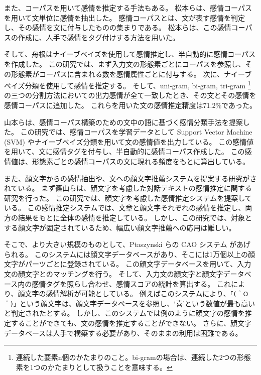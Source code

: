 \documentclass[11pt,a4j]{jsarticle}
\begin{document}
また、コーパスを用いて感情を推定する手法もある。
松本らは、感情コーパスを用いて文単位に感情を抽出した。
感情コーパスとは、文が表す感情を判定し、その感情を文に付与したものの集まりである。
松本らは、この感情コーパスの作成に、人手で感情をタグ付けする方法を用いた。

そして、舟根はナイーブベイズを使用して感情推定し、半自動的に感情コーパスを作成した。
この研究では、まず入力文の形態素ごとにコーパスを参照し、その形態素がコーパスに含まれる数を感情属性ごとに付与する。
次に、ナイーブベイズ分類を使用して感情を推定する。
そして、uni-gram, bi-gram, tri-gram \footnote{連続した要素n個のかたまりのこと。bi-gramの場合は、連続した2つの形態素を1つのかたまりとして扱うことを意味する。} の三つの分割方法においての出力感情が全て一致したとき、その文とその感情を感情コーパスに追加した。
これらを用いた文の感情推定精度は71.2\%であった。

山本らは、感情コーパス構築のための文中の語に基づく感情分類手法を提案した。
この研究では、感情コーパスを学習データとして Support Vector Machine (SVM) やナイーブベイズ分類を用いて文の感情値を出力している。
この感情値を用いて、文に感情タグを付与し、半自動的に感情コーパス作成した。
この感情値は、形態素ごとの感情コーパスの文に現れる頻度をもとに算出している。

また、顔文字からの感情抽出や、文への顔文字推薦システムを提案する研究がされている。
まず篠山らは、顔文字を考慮した対話テキストの感情推定に関する研究を行った。
この研究では、顔文字を考慮した感情推定システムを提案している。
この感情推定システムでは、文章と顔文字それぞれの感情を推定し、両方の結果をもとに全体の感情を推定している。
しかし、この研究では、対象とする顔文字が固定されているため、幅広い顔文字推薦への応用は難しい。

そこで、より大きい規模のものとして、Ptaszynski らの CAO システム があげられる。
このシステムには顔文字データベースがあり、そこには1万個以上の顔文字がパーツごとに登録されている。
この顔文字データベースを用いて、入力文の顔文字とのマッチングを行う。
そして、入力文の顔文字と顔文字データベース内の感情タグを照らし合わせ、感情スコアの統計を算出する。
これにより、顔文字の感情解析が可能としている。
例えばこのシステムにより、\verb|「(＾Ｏ＾)」|という顔文字は、顔文字データベースを参照し、`喜'という数値が最も高いと判定されたとする。
しかし、このシステムでは例のように顔文字の感情を推定することができても、文の感情を推定することができない。
さらに、顔文字データベースは人手で構築する必要があり、そのままの利用は困難である。
\end{document}
